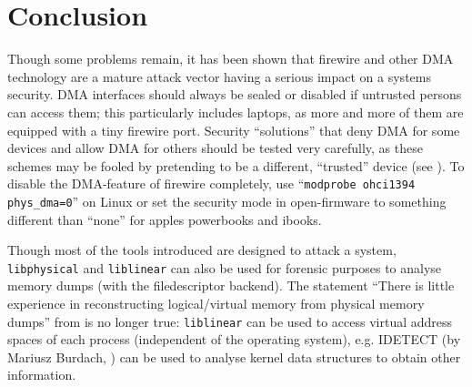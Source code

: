 %
%

\section{Conclusion}

Though some problems remain, it has been shown that firewire and other DMA
technology are a mature attack vector having a serious impact on a systems
security. DMA interfaces should always be sealed or disabled if untrusted
persons can access them; this particularly includes laptops, as more and more of
them are equipped with a tiny firewire port.  Security ``solutions'' that deny
DMA for some devices and allow DMA for others should be tested very carefully,
as these schemes may be fooled by pretending to be a different, ``trusted''
device (see \cite{rux2k6firewire:2006}). To disable the DMA-feature of firewire
completely, use ``\texttt{modprobe ohci1394 phys\_dma=0}'' on Linux or set the
security mode in open-firmware to something different than ``none'' for apples
powerbooks and ibooks. 


Though most of the tools introduced are designed to attack a system,
\texttt{libphysical} and \texttt{liblinear} can also be used for forensic
purposes to analyse memory dumps (with the filedescriptor backend). The
statement ``There is little experience in reconstructing logical/virtual memory
from physical memory dumps'' from \cite{cansecwest_firewire:2005} is no longer
true: \texttt{liblinear} can be used to access virtual address spaces of each
process (independent of the operating system), e.g. IDETECT (by Mariusz Burdach,
\cite{finding_digital_evidence_in_physical_memory:2006}) can be used to analyse
kernel data structures to obtain other information.

